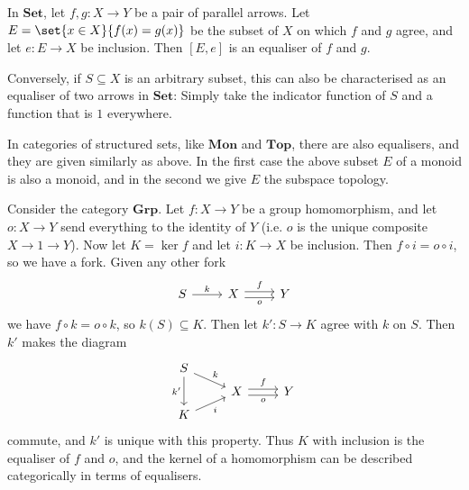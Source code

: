 \documentclass[article, a4paper, 11pt, oneside]{memoir}
\numberwithin{equation}{chapter}
\newcommand{\ncat}[1]{\mathbf{#1}} %
\newcommand{\catSet}{\ncat{Set}}
\newcommand{\catTop}{\ncat{Top}}
\newcommand{\catGrp}{\ncat{Grp}}
\newcommand{\catMon}{\ncat{Mon}}
\theoremstyle{myexample}
\theoremstyle{myexamplebreak}
\begin{document}
\begin{examplebreak}
    \begin{enumexample}
        \item In $\catSet$, let $f,g \colon X \to Y$ be a pair of parallel arrows. Let $E = \set{ x \in X }{ f(x) = g(x) }$ be the subset of $X$ on which $f$ and $g$ agree, and let $e \colon E \to X$ be inclusion. Then $[E,e]$ is an equaliser of $f$ and $g$.
        
        Conversely, if $S \subseteq X$ is an arbitrary subset, this can also be characterised as an equaliser of two arrows in $\catSet$: Simply take the indicator function of $S$ and a function that is $1$ everywhere.

        \item In categories of structured sets, like $\catMon$ and $\catTop$, there are also equalisers, and they are given similarly as above. In the first case the above subset $E$ of a monoid is also a monoid, and in the second we give $E$ the subspace topology.
        
        \item Consider the category $\catGrp$. Let $f \colon X \to Y$ be a group homomorphism, and let $o \colon X \to Y$ send everything to the identity of $Y$ (i.e. $o$ is the unique composite $X \to 1 \to Y$). Now let $K = \ker f$ and let $i \colon K \to X$ be inclusion. Then $f \circ i = o \circ i$, so we have a fork. Given any other fork
        \begin{equation*}
            \begin{tikzcd}
                S
                    \ar[r, "k"]
                & X
                    \ar[r, "f", shift left]
                    \ar[r, "o", shift right, swap]
                & Y
            \end{tikzcd}
        \end{equation*}
        we have $f \circ k = o \circ k$, so $k(S) \subseteq K$. Then let $k' \colon S \to K$ agree with $k$ on $S$. Then $k'$ makes the diagram
        \begin{equation*}
            \begin{tikzcd}[row sep=tiny]
                S
                    \ar[dr, "k"]
                    \ar[dd, "k'", swap]
                \\
                & X
                    \ar[r, "f", shift left]
                    \ar[r, "o", shift right, swap]
                & Y
                \\
                K
                    \ar[ur, "i", swap]
            \end{tikzcd}
        \end{equation*}
        commute, and $k'$ is unique with this property. Thus $K$ with inclusion is the equaliser of $f$ and $o$, and the kernel of a homomorphism can be described categorically in terms of equalisers.


\end{enumexample}
\end{examplebreak}
\end{document}

